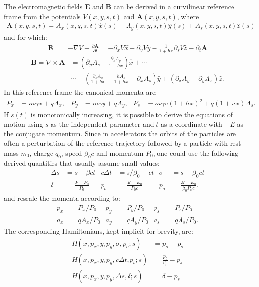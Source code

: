 \documentclass[english]{article}
\begin{document}
The electromagnetic fields {\bf E} and {\bf B} can be derived in a curvilinear
reference frame from the potentials $V(x,y,s,t)$ and $\mathbf{A}(x,y,s,t)$, where
\begin{align}
\mathbf{A}(x,y,s,t)=A_x(x,y,s,t) \hat x(s) + A_y(x,y,s,t) \hat y(s) + A_s(x,y,s,t) \hat z(s)
\end{align}
and for which:
\begin{align}
  \mathbf{E} & = -\nabla V - \frac{\partial \mathbf{A}}{\partial t} 
               = -\partial_x V \hat x - \partial_y V \hat y -
  \frac{1}{1+h x}  \partial_s V \hat z - \partial_t \mathbf{A}
\end{align}
\begin{align}
  \mathbf{B} = \nabla\times\mathbf{A} & =
  \left(\partial_y A_s - \frac{\partial_s  A_y}{1+h x} \right) \hat x +\cdots \\
  &\cdots+\left(\frac{\partial_s A_x}{1+h x}-\frac{h A_s}{1+h x}
  -\partial_x A_s \right)\hat y
  +\left(\partial_x A_y - \partial_y A_x \right) \hat z.
\end{align}
In this reference frame the canonical momenta are:
\begin{align}
  P_x&=m \gamma \dot x + q A_x, &
  P_y&=m \gamma \dot y + q A_y, &
  P_s&=m \gamma \dot s (1 + h x)^2 + q (1 + h x) A_s.
\end{align}
If $s(t)$ is monotonically increasing, it is possible to derive the equations
of motion using $s$ as the independent parameter and $t$ as a coordinate with
$-E$ as the conjugate momentum. Since in accelerators the orbits of the
particles are often a perturbation of the reference trajectory followed by a
particle with rest mass $m_0$, charge $q_0$, speed $\beta_0 c$ and momentum
$P_0$, one could use the following derived quantities that usually assume small
values:
\begin{align}
  \Delta s  &=s - \beta  ct &
  c\Delta t &=s/\beta_0 - ct &
  \sigma    &= s - \beta_0 ct \\
  \delta    &=\frac{P-P_0}{P_0} &
  p_t       &=\frac{E-E_0}{P_0 c} &
  p_\sigma  &=\frac{E-E_0}{\beta_0 P_0 c}.
\end{align}
and rescale the momenta according to:
\begin{align}
  p_x&=P_x/P_0 &
  p_y&=P_y/P_0 &
  p_s&=P_s/P_0  \\
  a_x &=qA_x/P_0&
  a_y &=qA_y/P_0&
  a_s &=qA_s/P_0.
\end{align}
The corresponding Hamiltonians, kept implicit for brevity, are:
\begin{align}
  H \left(x,p_x,y,p_y,\sigma,p_\sigma;s\right) &= p_\sigma - p_s\\
  H \left(x,p_x,y,p_y,c\Delta t,p_t;s\right) &= \frac{p_t}{\beta_0} - p_s\\
  H \left(x,p_x,y,p_y,\Delta s,\delta;s\right) &= \delta - p_s,
\end{align}
\end{document}

